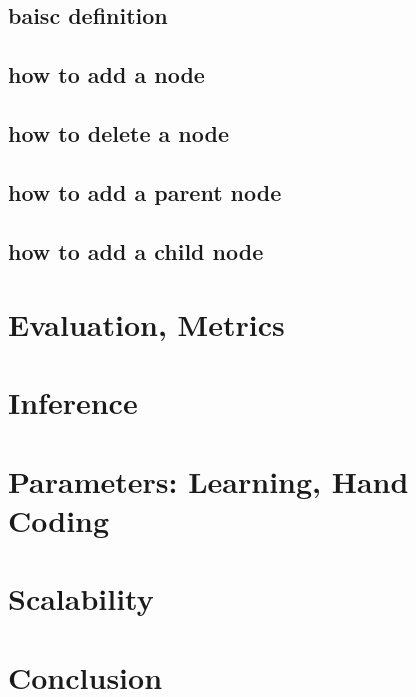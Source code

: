 \documentclass{article}
\begin{document}
\subsection{baisc definition}
\subsection{how to add a node}
\subsection{how to delete a node}
\subsection{how to add a parent node}
\subsection{how to add a child node}

\section{Evaluation, Metrics}

\section{Inference}

\section{Parameters: Learning, Hand Coding}

\section{Scalability}

\section{Conclusion}
\end{document}
